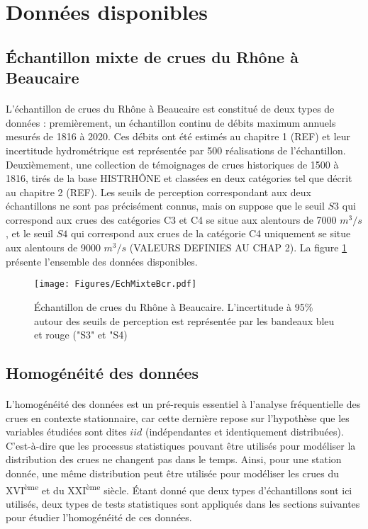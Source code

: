 \documentclass[11pt]{article}
\begin{document}
		
\section{Données disponibles}
\label{sec:dataBcr}

	\subsection{Échantillon mixte de crues du Rhône à Beaucaire}
	\paragraph{} L'échantillon de crues du Rhône à Beaucaire est constitué de deux types de données : premièrement, un échantillon continu de débits maximum annuels mesurés de 1816 à 2020. Ces débits ont été estimés au chapitre 1 (REF) et leur incertitude hydrométrique est représentée par 500 réalisations de l'échantillon. Deuxièmement, une collection de témoignages de crues historiques de 1500 à 1816, tirés de la base HISTRHÔNE et classées en deux catégories tel que décrit au chapitre 2 (REF). Les seuils de perception correspondant aux deux échantillons ne sont pas précisément connus, mais on suppose que le seuil $S3$ qui correspond aux crues des catégories C3 et C4 se situe aux alentours de 7000 $m^3/s$, et le seuil $S4$ qui correspond aux crues de la catégorie C4 uniquement se situe aux alentours de 9000 $m^3/s$ (VALEURS DEFINIES AU CHAP 2). La figure \ref{fig:EchMixte} présente l'ensemble des données disponibles. 
	
	\begin{figure}[h]
		\texttt{[image: Figures/EchMixteBcr.pdf]}	
		\caption{Échantillon de crues du Rhône à Beaucaire. L'incertitude à 95\% autour des seuils de perception est représentée par les bandeaux bleu et rouge ("S3" et "S4)}
		\label{fig:EchMixte}
	\end{figure}
	

	\subsection{Homogénéité des données}
	\label{subsec:homog}
	\paragraph{} L'homogénéité des données est un pré-requis essentiel à l'analyse fréquentielle des crues en contexte stationnaire, car cette dernière repose sur l'hypothèse que les variables étudiées sont dites $iid$ (indépendantes et identiquement distribuées). C'est-à-dire que les processus statistiques pouvant être utilisés pour modéliser la distribution des crues ne changent pas dans le temps. Ainsi, pour une station donnée, une même distribution peut être utilisée pour modéliser les crues du XVI\textsuperscript{ème} et du XXI\textsuperscript{ème} siècle. Étant donné que deux types d'échantillons sont ici utilisés, deux types de tests statistiques sont appliqués dans les sections suivantes pour étudier l'homogénéité de ces données. 
\end{document}
